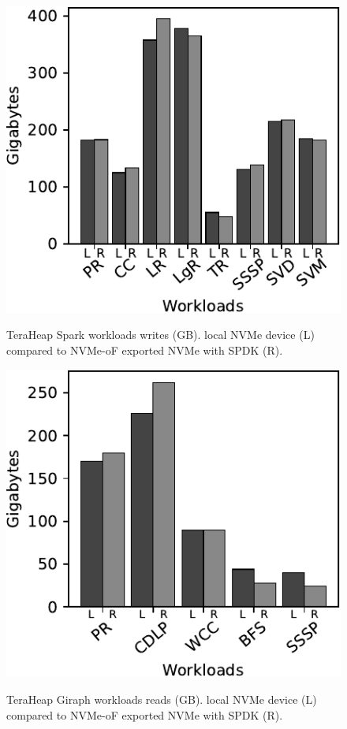 \begin{figure}[H]
  \includegraphics[width=\linewidth]{figures/spark_w.pdf}\\
\caption{TeraHeap Spark workloads writes (GB). local NVMe device (L) compared to NVMe-oF exported NVMe with SPDK (R).}
\label{fig:spark_w}
\end{figure}
\begin{figure}[H]
  \includegraphics[width=\linewidth]{figures/giraph_r.pdf}\\
\caption{TeraHeap Giraph workloads reads (GB). local NVMe device (L) compared to NVMe-oF exported NVMe with SPDK (R).}
\label{fig:giraph_r}
\end{figure}

